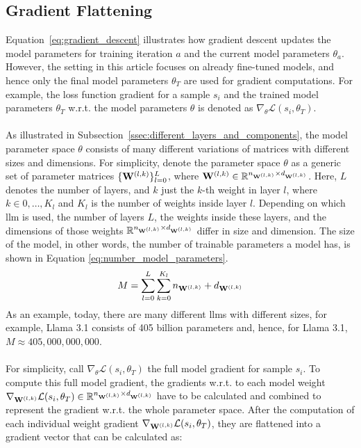\subsection{Gradient Flattening}\label{subsec:gradient_flattening}
Equation~\ref{eq:gradient_descent} illustrates how gradient descent updates the model parameters for training iteration $a$ and the current model parameters $\theta_a$. However, the setting in this article focuses on already fine-tuned models, and hence only the final model parameters $\theta_T$ are used for gradient computations. For example, the loss function gradient for a sample $s_i$ and the trained model parameters $\theta_T$ w.r.t. the model parameters $\theta$ is denoted as $\nabla_{\theta} \mathcal{L}(s_i, \theta_T)$.
\\\\
As illustrated in Subsection~\ref{ssec:different_layers_and_components}, the model parameter space $\theta$ consists of many different variations of matrices with different sizes and dimensions. For simplicity, denote the parameter space $\theta$ as a generic set of parameter matrices
$\{\mathbf{W}^{(l,k)}\}_{l=0}^L$, where $\mathbf{W}^{(l,k)} \in \mathbb{R}^{n_{\mathbf{W}^{(l,k)}} \times d_{\mathbf{W}^{(l,k)}}}$. Here, $L$ denotes the number of layers, and $k$ just the $k$-th weight in layer $l$, where $k \in 0,\dots,K_l$ and $K_l$ is the number of weights inside layer $l$. Depending on which \acrshort{llm} is used, the number of layers $L$, the weights inside these layers, and the dimensions of those weights $\mathbb{R}^{n_{\mathbf{W}^{(l,k)}} \times d_{\mathbf{W}^{(l,k)}}}$ differ in size and dimension. The size of the model, in other words, the number of trainable parameters a model has, is shown in Equation \ref{eq:number_model_parameters}.
\begin{equation}
    M = \sum_{l=0}^{L} \sum_{k=0}^{K_l} n_{\mathbf{W}^{(l,k)}} + d_{\mathbf{W}^{(l,k)}}
    \label{eq:number_model_parameters}
\end{equation}
As an example, today, there are many different \acrlong{llm}s with different sizes, for example, Llama 3.1 consists of 405 billion parameters \cite{grattafiori2024llama3herdmodels} and, hence, for Llama 3.1, $M \approx 405,000,000,000$.
\\\\
For simplicity, call $\nabla_{\theta} \mathcal{L}(s_i, \theta_T)$ the full model gradient for sample $s_i$. To compute this full model gradient, the gradients w.r.t. to each model weight $\nabla_{\mathbf{W}^{(l,k)}} \mathcal{L}(s_i, \theta_T) \in \mathbb{R}^{n_{\mathbf{W}^{(l,k)}} \times d_{\mathbf{W}^{(l,k)}}}$ have to be calculated and combined to represent the gradient w.r.t. the whole parameter space. After the computation of each individual weight gradient $\nabla_{\mathbf{W}^{(l,k)}} \mathcal{L}(s_i, \theta_T)$, they are flattened into a gradient vector that can be calculated as: 
